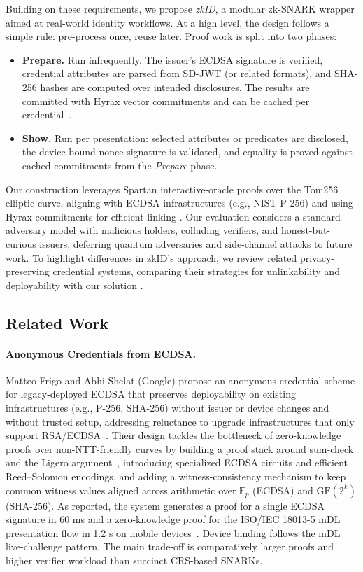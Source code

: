 Building on these requirements, we propose \emph{zkID}, a modular zk-SNARK wrapper aimed at real-world identity workflows. At a high level, the design follows a simple rule: pre-process once, reuse later. Proof work is split into two phases:
\begin{itemize}
    \item \textbf{Prepare.} Run infrequently. The issuer’s ECDSA signature is verified, credential attributes are parsed from SD-JWT (or related formats), and SHA-256 hashes are computed over intended disclosures. The results are committed with Hyrax vector commitments and can be cached per credential~\cite{cryptoeprint:2017/1132}.
    \item \textbf{Show.} Run per presentation: selected attributes or predicates are disclosed, the device-bound nonce signature is validated, and equality is proved against cached commitments from the \emph{Prepare} phase.
\end{itemize}

Our construction leverages Spartan interactive-oracle proofs over the Tom256 elliptic curve, aligning with ECDSA infrastructures (e.g., NIST P-256) and using Hyrax commitments for efficient linking \cite{C:Setty20,cryptoeprint:2017/1132}. Our evaluation considers a standard adversary model with malicious holders, colluding verifiers, and honest-but-curious issuers, deferring quantum adversaries and side-channel attacks to future work. To highlight differences in zkID’s approach, we review related privacy-preserving credential systems, comparing their strategies for unlinkability and deployability with our solution \cite{cryptoeprint:2024/2010,cryptoeprint:2024/2013}.

\subsection{Related Work}

\paragraph{Anonymous Credentials from ECDSA.}
Matteo Frigo and Abhi Shelat (Google) propose an anonymous credential scheme for legacy-deployed ECDSA that preserves deployability on existing infrastructures (e.g., P-256, SHA-256) without issuer or device changes and without trusted setup, addressing reluctance to upgrade infrastructures that only support RSA/ECDSA~\cite{cryptoeprint:2024/2010}. Their design tackles the bottleneck of zero-knowledge proofs over non-NTT-friendly curves by building a proof stack around sum-check and the Ligero argument~\cite{CCS:AHIV17}, introducing specialized ECDSA circuits and efficient Reed–Solomon encodings, and adding a witness-consistency mechanism to keep common witness values aligned across arithmetic over $\mathbb{F}_{p}$ (ECDSA) and $\mathrm{GF}(2^k)$ (SHA-256). As reported, the system generates a proof for a single ECDSA signature in 60 ms and a zero-knowledge proof for the ISO/IEC 18013-5 mDL presentation flow in 1.2 s on mobile devices~\cite[\S5.3,\S6.2]{cryptoeprint:2024/2010}. Device binding follows the mDL live-challenge pattern. The main trade-off is comparatively larger proofs and higher verifier workload than succinct CRS-based SNARKs.

